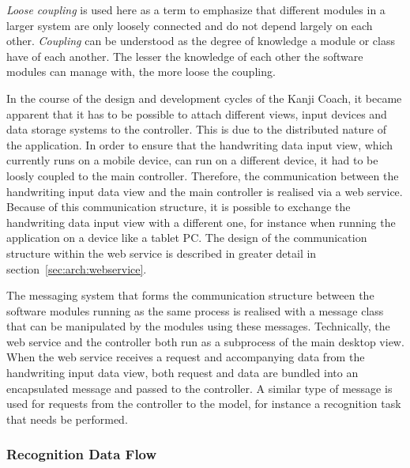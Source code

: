 \emph{Loose coupling} is used here as a term to emphasize that different modules 
in a larger system are only loosely connected and do not depend largely on each 
other. \emph{Coupling} can be understood as the degree of knowledge a module or 
class have of each another. The lesser the knowledge of each other the software 
modules can manage with, the more loose the coupling.

In the course of the design and development cycles of the Kanji Coach, 
it became apparent that it has to be possible to attach different views, 
input devices and data storage systems to the controller. This is due to the 
distributed nature of the application. 
In order to ensure that the handwriting data input view, which currently runs 
on a mobile device, can run on a different device, it had to be loosly coupled 
to the main controller. Therefore, the communication between the handwriting 
input data view and the main controller is realised via a web service. 
Because of this communication structure, it is possible to exchange the 
handwriting data input view with a different one, for instance when running 
the application on a device like a tablet PC. The design of the communication 
structure within the web service is described in greater detail 
in section~\ref{sec:arch:webservice}.

The messaging system that forms the communication structure between the software 
modules running as the same process is realised with a message class that
can be manipulated by the modules using these messages.
Technically, the web service and the controller both run as a subprocess of the 
main desktop view. When the web service receives a request and accompanying data
from the handwriting input data view, both request and data are bundled into an 
encapsulated message and passed to the controller. A similar type of message 
is used for requests from the controller to the model, for instance a recognition
task that needs be performed.



\subsubsection{Recognition Data Flow}
\label{sec:arch:recognitiondataflow}

